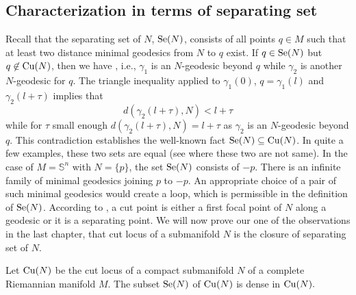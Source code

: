 \subsection{Characterization in terms of separating set}
\hfb Recall that the separating set  of $N$, $\mathrm{Se}(N)$, consists of all points $q\in M$ such that at least two distance minimal geodesics from $N$ to $q$ exist. If $q\in \mathrm{Se}(N)$ but $q\not\in \mathrm{Cu}(N)$, then we have , i.e., $\gamma_1$ is an $N$-geodesic beyond $q$ while $\gamma_2$ is another $N$-geodesic for $q$. The triangle inequality applied to $\gamma_1(0)$, $q=\gamma_1(l)$ and $\gamma_2(l+\tau)$ implies that 
\begin{displaymath}
    d(\gamma_2(l+\tau),N)< l+\tau
\end{displaymath}
while for $\tau$ small enough $d(\gamma_2(l+\tau),N)=l+\tau$ as $\gamma_2$ is an $N$-geodesic beyond $q$. This contradiction establishes the well-known fact $\mathrm{Se}(N)\subseteq \mathrm{Cu}(N)$. In quite a few examples, these two sets are equal (see  where these two are not same). In the case of $M=\mathbb{S}^n$ with $N=\{p\}$, the set $\mathrm{Se}(N)$ consists of $-p$. There is an infinite family of minimal geodesics joining $p$ to $-p$. An appropriate choice of a pair of such minimal geodesics would create a loop, which is permissible in the definition of $\mathrm{Se}(N)$. According to , a cut point is either a first focal point of $N$ along a geodesic or it is a separating point. We will now prove our one of the observations in the last chapter, that  cut locus of a submanifold $N$ is the closure of separating set of $N$. 
\begin{thm}\label{thm: Theorem 2}\label{thm:SeClosureIsCutLocus}
    Let $\mathrm{Cu}(N)$ be the cut locus of a compact submanifold $N$  of a  complete Riemannian manifold $M$. The subset $\mathrm{Se}(N)$ of $\mathrm{Cu}(N)$ is dense in $\mathrm{Cu}(N).$
\end{thm}
